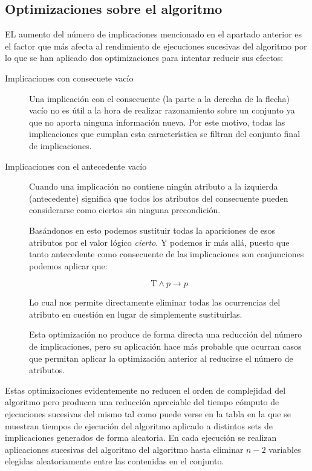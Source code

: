 \subsection*{Optimizaciones sobre el algoritmo}
	
	EL aumento del número de implicaciones mencionado en el apartado anterior es el factor que más afecta al rendimiento de ejecuciones sucesivas del algoritmo por lo que se han aplicado dos optimizaciones para intentar reducir sus efectos:

	\begin{description}
		\item[Implicaciones con consecuete vacío] 
			Una implicación con el 	consecuente (la parte a la derecha de la flecha) vacío no es útil a la hora de realizar razonamiento sobre un conjunto ya que no aporta ninguna información nueva. Por este motivo, todas las implicaciones que cumplan esta característica se filtran del conjunto final de implicaciones.
		\item[Implicaciones con el antecedente vacío] 
			Cuando una implicación no contiene ningún atributo a la izquierda (antecedente) significa que todos los atributos del consecuente pueden considerarse como ciertos sin ninguna precondición. 
	
			Basándonos en esto podemos sustituir todas la apariciones de esos atributos por el valor lógico \textit{cierto}. Y podemos ir más allá, puesto que tanto antecedente como consecuente de las implicaciones son conjunciones podemos aplicar que:
			
			\[
				\text{T} \wedge p \rightarrow p
			\]		
			
			Lo cual nos permite directamente eliminar todas las ocurrencias del atributo en cuestión en lugar de simplemente sustituirlas. 
			
			Esta optimización no produce de forma directa una reducción del número de implicaciones, pero su aplicación hace más probable que ocurran casos que permitan aplicar la optimización anterior al reducirse el número de atributos.	
	\end{description}

	Estas optimizaciones evidentemente no reducen el orden de complejidad del algoritmo pero producen una reducción apreciable del tiempo cómputo de ejecuciones sucesivas del mismo tal como puede verse en la tabla  en la que se muestran tiempos de ejecución del algoritmo aplicado a distintos sets de implicaciones generados de forma aleatoria. En cada ejecución se realizan aplicaciones sucesivas del algoritmo del algoritmo hasta eliminar $n-2$ variables elegidas aleatoriamente entre las contenidas en el conjunto. 

